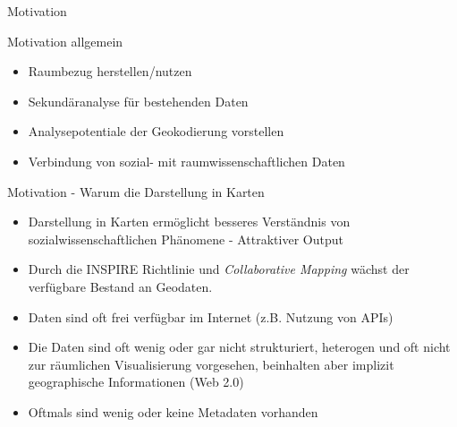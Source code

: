 \documentclass[ignorenonframetext,]{beamer}
\providecommand{\tightlist}{%
  \setlength{\itemsep}{0pt}\setlength{\parskip}{0pt}}
\begin{document}
\begin{frame}{Motivation}

\begin{block}{Motivation allgemein}

\begin{itemize}
\tightlist
\item
  Raumbezug herstellen/nutzen
\item
  Sekundäranalyse für bestehenden Daten
\item
  Analysepotentiale der Geokodierung vorstellen
\item
  Verbindung von sozial- mit raumwissenschaftlichen Daten
\end{itemize}

\end{block}

\begin{block}{Motivation - Warum die Darstellung in Karten}

\begin{itemize}
\item
  Darstellung in Karten ermöglicht besseres Verständnis von
  sozialwissenschaftlichen Phänomene - Attraktiver Output
\item
  Durch die INSPIRE Richtlinie und \emph{Collaborative Mapping} wächst
  der verfügbare Bestand an Geodaten.
\item
  Daten sind oft frei verfügbar im Internet (z.B. Nutzung von APIs)
\item
  Die Daten sind oft wenig oder gar nicht strukturiert, heterogen und
  oft nicht zur räumlichen Visualisierung vorgesehen, beinhalten aber
  implizit geographische Informationen (Web 2.0)
\item
  Oftmals sind wenig oder keine Metadaten vorhanden
\end{itemize}

\end{block}

\end{frame}
\end{document}
